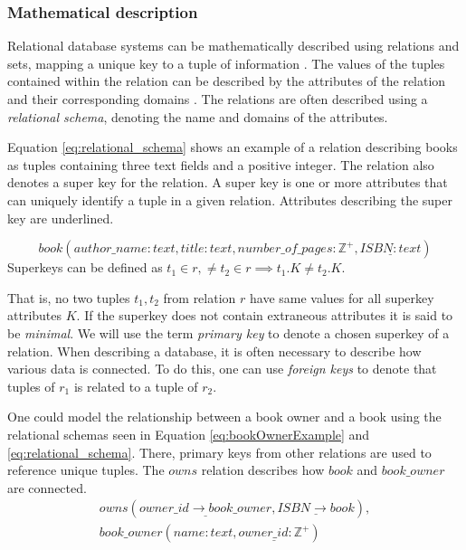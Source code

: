 \subsubsection*{Mathematical description}
Relational database systems can be mathematically described using relations and sets, mapping a unique key to a tuple of information \cite[Chapter~2.3]{DBSBook}.
The values of the tuples contained within the relation can be described by the attributes of the relation and their corresponding domains \cite{KatjaFirstPP}. 
The relations are often described using a \textit{relational schema}, denoting the name and domains of the attributes.

Equation \ref{eq:relational_schema} shows an example of a relation describing books as tuples containing three text fields and a positive integer.
The relation also denotes a super key for the relation. A super key is one or more attributes that can uniquely identify a tuple in a given relation. Attributes describing the super key are underlined.

\begin{equation} \label{eq:relational_schema}
    book(author\_name:text, title: text, number\_of\_pages:\mathbb{Z}^+, \underline{ISBN: text})
\end{equation}
Superkeys can be defined as $t_1 \in r,\neq t_2 \in r \implies t_1.K \neq t_2.K$. 

That is, no two tuples $t_1, t_2$ from relation $r$ have same values for all superkey attributes $K$. 
If the superkey does not contain extraneous attributes it is said to be \textit{minimal}. \cite[Chapter 2.3]{DBSBook}
We will use the term \textit{primary key} to denote a chosen superkey of a relation. 
When describing a database, it is often necessary to describe how various data is connected. 
To do this, one can use \textit{foreign keys} to denote that tuples of $r_1$ is related to a tuple of $r_2$.


One could model the relationship between a book owner and a book using the relational schemas seen in Equation \ref{eq:bookOwnerExample} and \ref{eq:relational_schema}.
There, primary keys from other relations are used to reference unique tuples. The $owns$ relation describes how $book$ and $book\_owner$ are connected. 
\begin{equation}\label{eq:bookOwnerExample}
    \begin{split}
        owns(\underline{owner\_id \rightarrow book\_owner}, \underline{ISBN \rightarrow book}), \\
        book\_owner(name:text,\underline{owner\_id:\mathbb{Z}^+})
    \end{split}
\end{equation}

